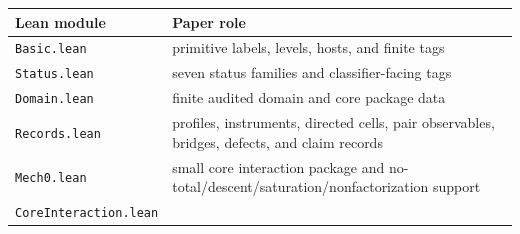 \documentclass[11pt]{article}
\theoremstyle{definition}
\begin{document}
\begin{longtable}[]{@{}ll@{}}
\toprule
\begin{minipage}[b]{0.47\columnwidth}\raggedright
Lean module\strut
\end{minipage} & \begin{minipage}[b]{0.47\columnwidth}\raggedright
Paper role\strut
\end{minipage}\tabularnewline
\midrule
\endhead
\begin{minipage}[t]{0.47\columnwidth}\raggedright
\texttt{Basic.lean}\strut
\end{minipage} & \begin{minipage}[t]{0.47\columnwidth}\raggedright
primitive labels, levels, hosts, and finite tags\strut
\end{minipage}\tabularnewline
\begin{minipage}[t]{0.47\columnwidth}\raggedright
\texttt{Status.lean}\strut
\end{minipage} & \begin{minipage}[t]{0.47\columnwidth}\raggedright
seven status families and classifier-facing tags\strut
\end{minipage}\tabularnewline
\begin{minipage}[t]{0.47\columnwidth}\raggedright
\texttt{Domain.lean}\strut
\end{minipage} & \begin{minipage}[t]{0.47\columnwidth}\raggedright
finite audited domain and core package data\strut
\end{minipage}\tabularnewline
\begin{minipage}[t]{0.47\columnwidth}\raggedright
\texttt{Records.lean}\strut
\end{minipage} & \begin{minipage}[t]{0.47\columnwidth}\raggedright
profiles, instruments, directed cells, pair observables, bridges, defects, and claim records\strut
\end{minipage}\tabularnewline
\begin{minipage}[t]{0.47\columnwidth}\raggedright
\texttt{Mech0.lean}\strut
\end{minipage} & \begin{minipage}[t]{0.47\columnwidth}\raggedright
small core interaction package and no-total/descent/saturation/nonfactorization support\strut
\end{minipage}\tabularnewline
\begin{minipage}[t]{0.47\columnwidth}\raggedright
\texttt{CoreInteraction.lean}\strut
\end{minipage} & \begin{minipage}[t]{0.47\columnwidth}\raggedright

\end{minipage}
\end{longtable}
\end{document}
